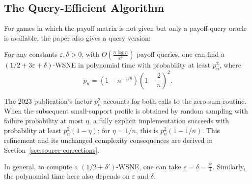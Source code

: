 \subsection{The Query-Efficient Algorithm}

For games in which the payoff matrix is not given but only a payoff-query oracle is available, the paper also gives a query version:

\begin{theorem}
  \label{thm:query-efficient-version}
  For any constants \(\varepsilon, \delta > 0\), with \(O\left( \frac{n \log n}{\varepsilon^4} \right)\) payoff queries, one can find a \((1/2 + 3\varepsilon + \delta)\)-WSNE in polynomial time with probability at least \(p_n^2\), where
  \[
    p_n = \left(1 - n^{-1 / 8}\right)\left(1 - \frac{2}{n}\right)^2.
  \]
\end{theorem}

The 2023 publication's factor \(p_n^2\) accounts for both calls to the zero-sum routine. When the subsequent small-support profile is obtained by random sampling with failure probability at most \(\eta\), a fully explicit implementation succeeds with probability at least \(p_n^2(1-\eta)\); for \(\eta=1/n\), this is \(p_n^2(1-1/n)\). This refinement and its unchanged complexity consequences are derived in Section~\ref{sec:source-corrections}.

In general, to compute a \((1/2 + \delta')\)-WSNE, one can take \(\varepsilon = \delta = \frac{\delta'}{4}\). Similarly, the polynomial time here also depends on \(\varepsilon\) and \(\delta\).

